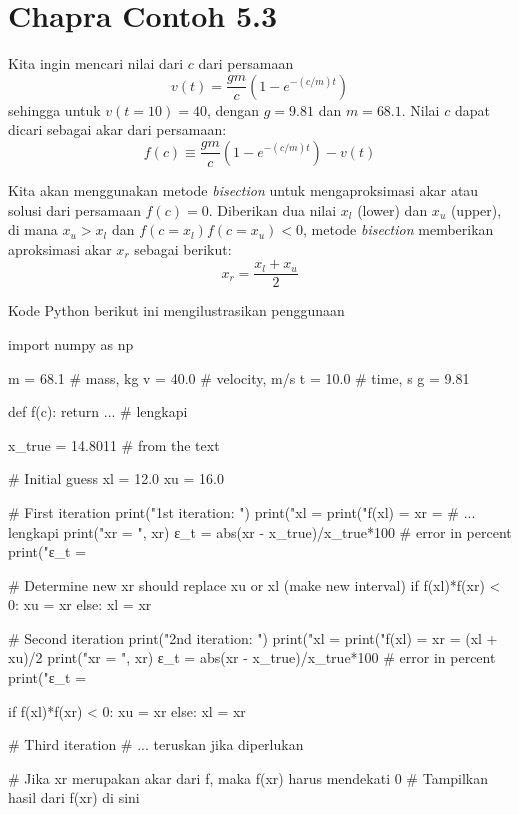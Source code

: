 \section{Chapra Contoh 5.3}

Kita ingin mencari nilai dari $c$ dari persamaan
\begin{equation*}
v(t) = \frac{gm}{c}(1 - e^{-(c/m)t})
\end{equation*}
sehingga untuk $v(t=10) = 40$, dengan $g=9.81$ dan $m=68.1$.
Nilai $c$ dapat dicari sebagai akar dari persamaan:
\begin{equation*}
f(c) \equiv \frac{gm}{c}(1 - e^{-(c/m)t}) - v(t)
\end{equation*}

Kita akan menggunakan metode \textit{bisection} untuk mengaproksimasi akar atau solusi dari
persamaan $f(c) = 0$. Diberikan dua nilai $x_{l}$ (lower) dan $x_{u}$ (upper), di mana
$x_{u} > x_{l}$ dan $f(c=x_{l})f(c=x_{u}) < 0$, metode \textit{bisection} memberikan
aproksimasi akar $x_{r}$ sebagai berikut:
\begin{equation}
x_{r} = \frac{x_{l} + x_{u}}{2}
\end{equation}

Kode Python berikut ini mengilustrasikan penggunaan 
\begin{pythoncode}
import numpy as np

m = 68.1 # mass, kg
v = 40.0 # velocity, m/s
t = 10.0 # time, s
g = 9.81
    
def f(c):
    return ... # lengkapi
    
x_true = 14.8011 # from the text
    
# Initial guess
xl = 12.0
xu = 16.0
    
# First iteration
print("\n1st iteration: ")
print("xl = %
print("f(xl) = %
xr = # ... lengkapi
print("xr = ", xr)
ε_t = abs(xr - x_true)/x_true*100 # error in percent
print("ε_t = %

# Determine new xr should replace xu or xl (make new interval)
if f(xl)*f(xr) < 0:
    xu = xr
else:
    xl = xr
    
# Second iteration
print("\n2nd iteration: ")
print("xl = %
print("f(xl) = %
xr = (xl + xu)/2
print("xr = ", xr)
ε_t = abs(xr - x_true)/x_true*100 # error in percent
print("ε_t = %

if f(xl)*f(xr) < 0:
    xu = xr
else:
    xl = xr
    
# Third iteration
# ... teruskan jika diperlukan

# Jika xr merupakan akar dari f, maka f(xr) harus mendekati 0
# Tampilkan hasil dari f(xr) di sini
\end{pythoncode}

